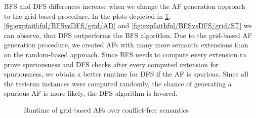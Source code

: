 BFS and DFS differences increase when we change the AF generation approach to the grid-based procedure. In the plots depicted in \cref{fig:expfaithful/BFSvsDFS/grid/CF}, \cref{fig:expfaithful/BFSvsDFS/grid/AD} and \cref{fig:expfaithful/BFSvsDFS/grid/ST} we can observe, that DFS outperforms the BFS algorithm. Due to the grid-based AF generation procedure, we created AFs with many more semantic extensions than on the random-based approach. Since BFS needs to compute every extension to prove spuriousness and DFS checks after every computed extension for spuriousness, we obtain a better runtime for DFS if the AF is spurious. Since all the test-run instances were computed randomly, the chance of generating a spurious AF is more likely, the DFS algorithm is favored.




\begin{figure}[H]
    \centering
    \caption{Runtime of grid-based AFs over conflict-free semantics}
    \label{fig:expfaithful/BFSvsDFS/grid/CF}
\end{figure}


